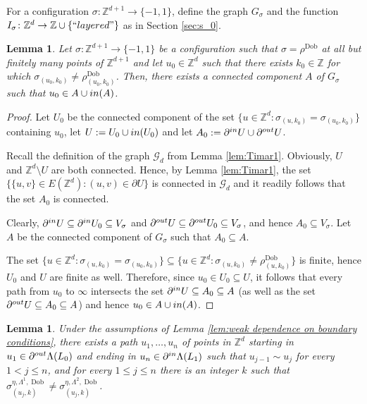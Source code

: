 \documentclass[11pt, reqno]{amsart}
\newtheorem{lemma}[theorem]{Lemma}
\newcommand{\Z}{\mathbb{Z}}
\DeclareMathOperator{\Dob}{Dob}
\numberwithin{equation}{section}
\begin{document}
For a configuration $\sigma:{\mathbb Z}^{d+1}\to\{-1,1\}$, define the graph $G_{\sigma}$ and the function $I_{\sigma}\colon {\mathbb Z}^d \to \Z \cup\{{\rm ``layered"}\}$ as in Section \ref{sec:s_0}.

\begin{lemma}
\label{lem:surrounds}
Let $\sigma:{\mathbb Z}^{d+1}\to\{-1,1\}$ be a configuration such that $\sigma=\rho^{\Dob}$ at all but finitely many points of ${\mathbb Z}^{d+1}$ and let $u_0\in{\mathbb Z}^d$ such that there exists $k_0\in \Z$ for which $\sigma_{(u_0,k_0)}\neq \rho ^{\Dob}_{(u_0,k_0)}$.
Then, there exists a connected component $A$ of $G_{\sigma}$ such that $u_0\in A\cup{\rm in}(A)$.
\end{lemma}

\begin{proof}
Let $U_0$ be the connected component of the set $\{u\in{\mathbb Z}^d\colon \sigma_{(u,k_0)}= \sigma_{(u_0,k_0)}\}$ containing $u_0$, let $U:=U_0\cup{\rm in}(U_0)$ and let $A_0:=\partial^{\rm in}U\cup\partial^{\rm out}U$. 

Recall the definition of the graph ${\mathcal G}_d$ from Lemma \ref{lem:Timar1}. Obviously, $U$ and ${\mathbb Z}^d\setminus U$ are both connected. Hence, by Lemma \ref{lem:Timar1}, the set $\{\{u,v\}\in E({\mathbb Z}^d)\colon (u,v)\in\partial U\}$ is connected in ${\mathcal G}_d$ and it readily follows that the set $A_0$ is connected. 

Clearly, $\partial^{\rm in}U\subseteq\partial^{\rm in}U_0\subseteq V_{\sigma}$ and $\partial^{\rm out}U\subseteq\partial^{\rm out}U_0\subseteq V_{\sigma}$, and hence $A_0\subseteq V_{\sigma}$. 
Let $A$ be the connected component of $G_{\sigma}$ such that $A_0\subseteq A$.

The set $\{u\in{\mathbb Z}^d\colon \sigma_{(u,k_0)}= \sigma_{(u_0,k_0)}\}\subseteq\{u\in{\mathbb Z}^d\colon \sigma_{(u,k_0)}\neq \rho^{\Dob}_{(u,k_0)}\}$ is finite, hence $U_0$ and $U$ are finite as well.
Therefore, since $u_0\in U_0\subseteq U$, it follows that every path from $u_0$ to $\infty$ intersects the set $\partial^{\rm in}U\subseteq A_0\subseteq A$ (as well as the set $\partial^{\rm out}U\subseteq A_0\subseteq A $) and hence $u_0\in A\cup{\rm in}(A)$. 
\end{proof}

\begin{lemma}\label{lem:path}
Under the assumptions of Lemma \ref{lem:weak dependence on boundary conditions}, 
there exists a path $u_1,\dots,u_n$ of points in $\Z^{d}$ starting in $u_1 \in \partial^{\rm out} \Lambda(L_0)$ and ending in $u_n\in \partial ^{\rm in}\Lambda(L_1)$
such that $u_{j-1}\sim u_j$ for every $1<j\leq n$, and for every $1\leq j\leq n$ there is an integer $k$ such that $\sigma^{\eta,\Lambda^1,\Dob}_{(u_j,k)} \neq\sigma^{\eta,\Lambda^2,\Dob}_{(u_j,k)}$.
\end{lemma}
\end{document}
